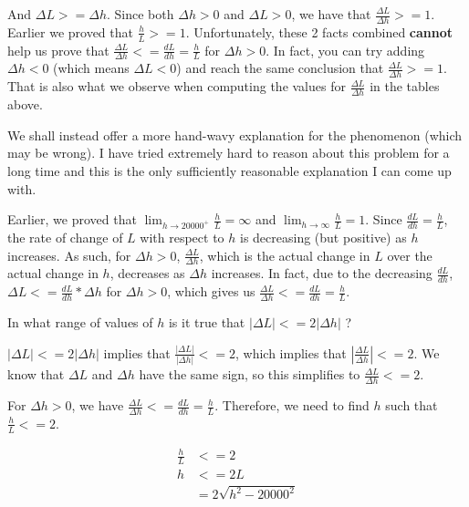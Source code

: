 \documentclass[9pt]{article}
\begin{document}
And $\Delta L >= \Delta h$. Since both $\Delta h > 0$ and $\Delta L > 0$, we have that $\frac{\Delta L}{\Delta h} >= 1$.  Earlier we proved that $\frac{h}{L} >= 1$. Unfortunately, these 2 facts combined \textbf{cannot} help us prove that $\frac{\Delta L}{\Delta h} <= \frac{dL}{dh} = \frac{h}{L}$ for $\Delta h > 0$. In fact, you can try adding $\Delta h < 0$ (which means $\Delta L < 0$) and reach the same conclusion that $\frac{\Delta L}{\Delta h} >= 1$. That is also what we observe when computing the values for $\frac{\Delta L}{\Delta h}$ in the tables above.

\bigskip

We shall instead offer a more hand-wavy explanation for the phenomenon (which may be wrong). I have tried extremely hard to reason about this problem for a long time and this is the only sufficiently reasonable explanation I can come up with.

\bigskip

Earlier, we proved that $\lim_{h \rightarrow 20000^+} \frac{h}{L} = \infty$ and $\lim_{h \rightarrow \infty} \frac{h}{L} = 1$. Since $\frac{dL}{dh} = \frac{h}{L}$, the rate of change of $L$ with respect to $h$ is decreasing (but positive) as $h$ increases. As such, for $\Delta h > 0$, $\frac{\Delta L}{\Delta h}$, which is the actual change in $L$ over the actual change in $h$, decreases as $\Delta h$ increases. In fact, due to the decreasing $\frac{dL}{dh}$, $\Delta L <= \frac{dL}{dh} * \Delta h$ for $\Delta h > 0$, which gives us $\frac{\Delta L}{\Delta h} <= \frac{dL}{dh} = \frac{h}{L}$.

\begin{tcolorbox}
  In what range of values of $h$ is it true that $|\Delta L| <= 2|\Delta h|$ ?
\end{tcolorbox}

$|\Delta L| <= 2|\Delta h|$ implies that $\frac{|\Delta L|}{|\Delta h|} <= 2$, which implies that $|\frac{\Delta L}{\Delta h}| <= 2$. We know that $\Delta L$ and $\Delta h$ have the same sign, so this simplifies to $\frac{\Delta L}{\Delta h} <= 2$.

For $\Delta h > 0$, we have $\frac{\Delta L}{\Delta h} <= \frac{dL}{dh} = \frac{h}{L}$. Therefore, we need to find $h$ such that $\frac{h}{L} <= 2$.

\begin{align*}
  \frac{h}{L} &<= 2 \\
  h &<= 2L \\
    &= 2\sqrt{h^2 - 20000^2}
\end{align*}
\end{document}
